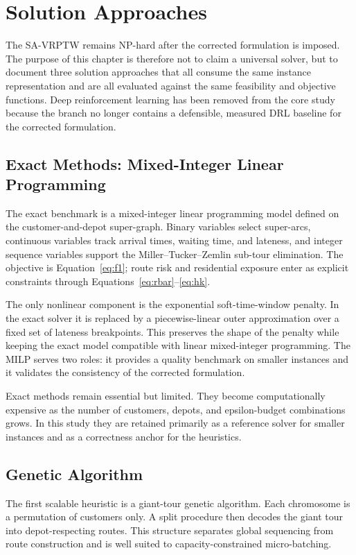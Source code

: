 \chapter{Solution Approaches}

The SA-VRPTW remains NP-hard after the corrected formulation is imposed. The purpose of this chapter is therefore not to claim a universal solver, but to document three solution approaches that all consume the same instance representation and are all evaluated against the same feasibility and objective functions. Deep reinforcement learning has been removed from the core study because the branch no longer contains a defensible, measured DRL baseline for the corrected formulation.

\section{Exact Methods: Mixed-Integer Linear Programming}

The exact benchmark is a mixed-integer linear programming model defined on the customer-and-depot super-graph. Binary variables select super-arcs, continuous variables track arrival times, waiting time, and lateness, and integer sequence variables support the Miller--Tucker--Zemlin sub-tour elimination. The objective is Equation~\ref{eq:f1}; route risk and residential exposure enter as explicit constraints through Equations~\ref{eq:rbar}--\ref{eq:hk}.

The only nonlinear component is the exponential soft-time-window penalty. In the exact solver it is replaced by a piecewise-linear outer approximation over a fixed set of lateness breakpoints. This preserves the shape of the penalty while keeping the exact model compatible with linear mixed-integer programming. The MILP serves two roles: it provides a quality benchmark on smaller instances and it validates the consistency of the corrected formulation.

Exact methods remain essential but limited. They become computationally expensive as the number of customers, depots, and epsilon-budget combinations grows. In this study they are retained primarily as a reference solver for smaller instances and as a correctness anchor for the heuristics.

\section{Genetic Algorithm}

The first scalable heuristic is a giant-tour genetic algorithm. Each chromosome is a permutation of customers only. A split procedure then decodes the giant tour into depot-respecting routes. This structure separates global sequencing from route construction and is well suited to capacity-constrained micro-batching.

